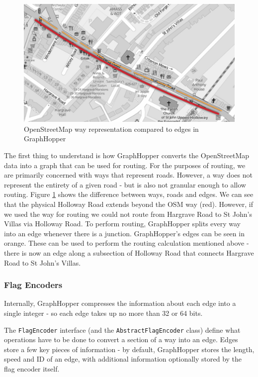 \documentclass[ %
                    author={Alexander Hill},
                supervisor={Dr. Benjamin Sach},
                    degree={MEng},
                     title={MARMOSET},
                  subtitle={Multi-Agent Route Management using Online Simulation for Efficient Transportation},
                      type={research},
                      year={2016} ]{dissertation}
\begin{document}
\begin{figure}[p]
    \centering
    \includegraphics[scale=0.6]{osm-gh}
    \caption{OpenStreetMap way representation compared to edges in GraphHopper}\label{fig:osm-gh}
\end{figure}

The first thing to understand is how GraphHopper converts the OpenStreetMap data
into a graph that can be used for routing.  For the purposes of routing, we are
primarily concerned with ways that represent roads. However, a way does not
represent the entirety of a given road - but is also not granular enough to
allow routing. Figure \ref{fig:osm-gh} shows the difference between ways, roads
and edges. We can see that the physical Holloway Road extends beyond the OSM way
(red). However, if we used the way for routing we could not route from Hargrave
Road to St John's Villas via Holloway Road. To perform routing, GraphHopper
splits every way into an edge whenever there is a junction. GraphHopper's edges
can be seen in orange. These can be used to perform the routing calculation
mentioned above - there is now an edge along a subsection of Holloway Road that
connects Hargrave Road to St John's Villas.

\subsubsection{Flag Encoders}

Internally, GraphHopper compresses the information about each edge into a single
integer - so each edge takes up no more than 32 or 64 bits.

The \texttt{FlagEncoder} interface (and the \texttt{AbstractFlagEncoder} class)
define what operations have to be done to convert a section of a way into an
edge. Edges store a few key pieces of information - by default, GraphHopper
stores the length, speed and ID of an edge, with additional information
optionally stored by the flag encoder itself.
\end{document}
